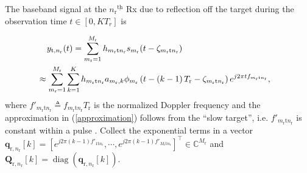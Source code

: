 \documentclass[10pt,journal]{IEEEtran}
\DeclareMathOperator{\diag}{\mathrm{diag}}
\newcommand{\paren}[1]{\left({#1}\right)}
\newcommand{\bracket}[1]{{\left [{#1}\right ]}}
\newcommand{\ith}[1]    {{#1}^{\underline{\text{th}}}}
\newcommand{\rr}{_\mathrm{r}}
\newcommand{\rnr}{_{\mathrm{r},n_\mathrm{r}}}
\newcommand{\target}{\mathrm{t}}
\theoremstyle{definition}
\begin{document}
The baseband signal at the $\ith{n\rr}$ Rx due to reflection off the target during the observation time $t\in[0,KT_r]$ is\par\noindent\small
\begin{align}
\label{target return_CT}
&y_{\mathrm{t},n\rr} (t)=\sum_{m_\mathrm{r}=1}^{M_\mathrm{r}}h_{m_\mathrm{r}\target n_\mathrm{r}}s_{m_\mathrm{r}}(t-\zeta_{m\rr \target n\rr }) \\
&\hspace{-4mm}\approx \sum_{m_\mathrm{r}=1}^{M_\mathrm{r}}\sum_{k=1}^{K} h_{m_\mathrm{r}\target n_\mathrm{r}}a_{m_\mathrm{r},k}\phi_{m_\mathrm{r}}\paren{t-\paren{k-1}T\rr-\zeta_{m\rr \target n\rr}}e^{j2\pi t
f_{m_\mathrm{r}\target n_\mathrm{r}}}, \label{approximation} 
\end{align}\normalsize
where $f'_{m_\mathrm{r}\target n_\mathrm{r}}\triangleq f_{m_\mathrm{r}\target n_\mathrm{r}}T\rr$ is the normalized Doppler frequency and the approximation in (\ref{approximation}) follows from the ``slow target'', i.e. $f'_{m_\mathrm{r}\target n_\mathrm{r}}$ %
is constant within a pulse \cite{hongbin_movingtarget,MCMIMO_Rad}.
Collect the exponential terms in a vector $\mathbf{q}_{\mathrm{r},n\rr}\bracket{k}=\bracket{e^{j2\pi\paren{k-1}f'_{1 \target n\rr}},\cdots,e^{j2\pi\paren{k-1}f'_{M\rr \target n\rr}}}^\top\in\mathbb{C}^{M\rr}$ and $\mathbf{Q}\rnr\bracket{k}=\diag\paren{\mathbf{q}_{\mathrm{r},n\rr}\bracket{k}}$.
\end{document}
